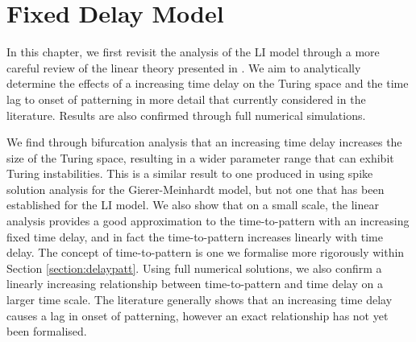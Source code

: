 \chapter{Fixed Delay Model}

In this chapter, we first revisit the analysis of the LI model through a more careful review of the linear theory presented in \cite{yigaffneyli,jiang}. We aim to analytically determine the effects of a increasing time delay on the Turing space and the time lag to onset of patterning in more detail that currently considered in the literature. Results are also confirmed through full numerical simulations.

We find through bifurcation analysis that an increasing time delay increases the size of the Turing space, resulting in a wider parameter range that can exhibit Turing instabilities. This is a similar result to one produced in \cite{fadai2} using spike solution analysis for the Gierer-Meinhardt model, but not one that has been established for the LI model. We also show that on a small scale, the linear analysis provides a good approximation to the time-to-pattern with an increasing fixed time delay, and in fact the time-to-pattern increases linearly with time delay. The concept of time-to-pattern is one we formalise more rigorously within Section \ref{section:delaypatt}. Using full numerical solutions, we also confirm a linearly increasing relationship between time-to-pattern and time delay on a larger time scale. The literature generally shows that an increasing time delay causes a lag in onset of patterning, however an exact relationship has not yet been formalised.

